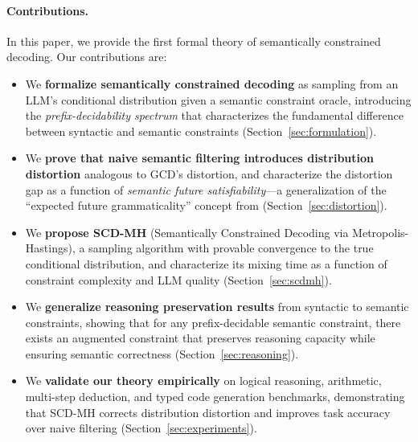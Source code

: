 \documentclass[twoside,11pt]{article}
\begin{document}
\paragraph{Contributions.} In this paper, we provide the first formal theory
of semantically constrained decoding. Our contributions are:
\begin{itemize}
    \item We \textbf{formalize semantically constrained decoding} as
    sampling from an LLM's conditional distribution given a semantic
    constraint oracle, introducing the \emph{prefix-decidability spectrum}
    that characterizes the fundamental difference between syntactic and
    semantic constraints (Section~\ref{sec:formulation}).

    \item We \textbf{prove that naive semantic filtering introduces
    distribution distortion} analogous to GCD's distortion, and
    characterize the distortion gap as a function of \emph{semantic future
    satisfiability}---a generalization of the ``expected future
    grammaticality'' concept from \citet{ugare2024gad}
    (Section~\ref{sec:distortion}).

    \item We \textbf{propose SCD-MH} (Semantically Constrained Decoding
    via Metropolis-Hastings), a sampling algorithm with provable convergence
    to the true conditional distribution, and characterize its mixing time
    as a function of constraint complexity and LLM quality
    (Section~\ref{sec:scdmh}).

    \item We \textbf{generalize reasoning preservation results} from
    syntactic to semantic constraints, showing that for any prefix-decidable
    semantic constraint, there exists an augmented constraint that preserves
    reasoning capacity while ensuring semantic correctness
    (Section~\ref{sec:reasoning}).

    \item We \textbf{validate our theory empirically} on logical reasoning,
    arithmetic, multi-step deduction, and typed code generation benchmarks,
    demonstrating that SCD-MH corrects distribution distortion and improves
    task accuracy over naive filtering (Section~\ref{sec:experiments}).
\end{itemize}

\end{document}
